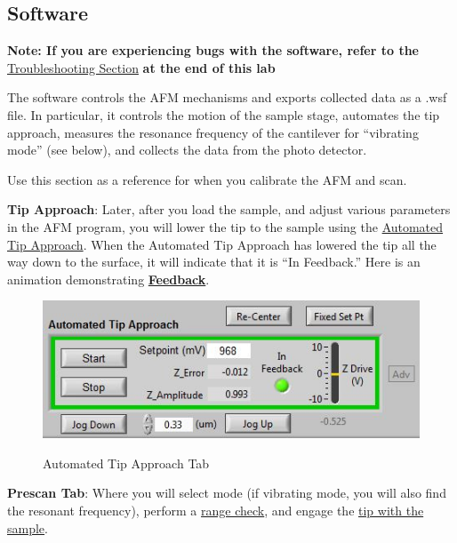 \documentclass{../lab}
\begin{document}
\subsection{Software}

\textbf{Note: If you are experiencing bugs with the software, refer to the} \hyperref[sec:Troubleshooting]{Troubleshooting Section} \textbf{at the end of this lab}

The software controls the AFM mechanisms and exports collected data as a .wsf file. In particular, it controls the motion of the sample stage, automates the tip approach, measures the resonance frequency of the cantilever for ``vibrating mode'' (see below), and collects the data from the photo detector.

Use this section as a reference for when you calibrate the AFM and scan.

\textbf{Tip Approach}:  Later, after you load the sample, and adjust various parameters in the AFM program, you will lower the tip to the sample using the \hyperref[subsec:TipApproach]{Automated Tip Approach}.  When the Automated Tip Approach has lowered the tip all the way down to the surface, it will indicate that it is ``In Feedback.'' Here is an animation demonstrating \href{http://experimentationlab.berkeley.edu/sites/default/files/AFMImages/4.4.\%20feedback.flv\_converted.mp4}{\textbf{Feedback}}.

\begin{figure}[H]
    \centering
    \href{http://experimentationlab.berkeley.edu/sites/default/files/AFMImages/infeedback.JPG}{\includegraphics[width=0.8\linewidth]{images/infeedback.JPG}}
    \label{fig:infeedback}
    \caption{Automated Tip Approach Tab}
\end{figure}

\pagebreak

\textbf{Prescan Tab}: Where you will select mode (if vibrating mode, you will also find the resonant frequency), perform a \hyperref[subsubsec:RangeCheck]{range check}, and engage the \hyperref[subsec:TipApproach]{tip with the sample}.
\end{document}

